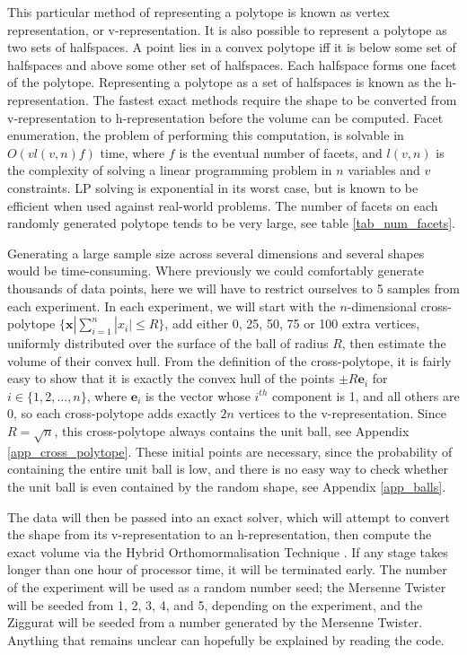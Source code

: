 This particular method of representing a polytope is known as vertex representation, or v-representation. It is also possible to represent a polytope as two sets of halfspaces. A point lies in a convex polytope iff it is below some set of halfspaces and above some other set of halfspaces. Each halfspace forms one facet of the polytope. Representing a polytope as a set of halfspaces is known as the h-representation. The fastest exact methods require the shape to be converted from v-representation to h-representation before the volume can be computed. Facet enumeration, the problem of performing this computation, is solvable in $O(vl(v,n)f)$ time\cite{Fukuda97}, where $f$ is the eventual number of facets, and $l(v,n)$ is the complexity of solving a linear programming problem in $n$ variables and $v$ constraints. LP solving is exponential in its worst case\cite{Klee72}, but is known to be efficient when used against real-world problems. The number of facets on each randomly generated polytope tends to be very large, see table \ref{tab_num_facets}.

Generating a large sample size across several dimensions and several shapes would be time-consuming. Where previously we could comfortably generate thousands of data points, here we will have to restrict ourselves to 5 samples from each experiment. In each experiment, we will start with the $n$-dimensional cross-polytope $\{{\bm x} | \sum^n_{i=1}|x_i| \leqslant R\}$, add either 0, 25, 50, 75 or 100 extra vertices, uniformly distributed over the surface of the ball of radius $R$, then estimate the volume of their convex hull. From the definition of the cross-polytope, it is fairly easy to show that it is exactly the convex hull of the points $\pm R{\bm e}_i$ for $i \in \{1,2,...,n\}$, where ${\bm e}_i$ is the vector whose $i^{th}$ component is 1, and all others are 0, so each cross-polytope adds exactly $2n$ vertices to the v-representation. Since $R=\sqrt{n}$, this cross-polytope always contains the unit ball, see Appendix \ref{app_cross_polytope}. These initial points are necessary, since the probability of containing the entire unit ball is low, and there is no easy way to check whether the unit ball is even contained by the random shape, see Appendix \ref{app_balls}.

The data will then be passed into an exact solver, which will attempt to convert the shape from its v-representation to an h-representation, then compute the exact volume via the Hybrid Orthomormalisation Technique \cite{Bueler98}. If any stage takes longer than one hour of processor time, it will be terminated early. The number of the experiment will be used as a random number seed; the Mersenne Twister will be seeded from 1, 2, 3, 4, and 5, depending on the experiment, and the Ziggurat will be seeded from a number generated by the Mersenne Twister. Anything that remains unclear can hopefully be explained by reading the code. %

